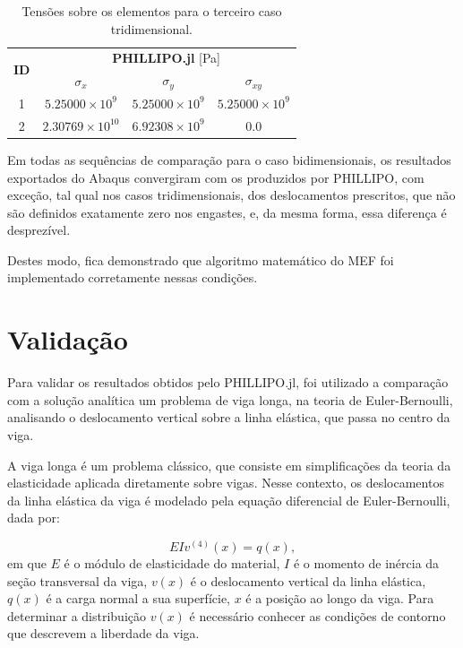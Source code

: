 \begin{table}
    \centering
    \caption{Tensões sobre os elementos para o terceiro caso tridimensional.}
    \begin{tabular}{c | c c c}
        \toprule
        \multirow{2}{*}{\textbf{ID}} & \multicolumn{3}{c}{\textbf{PHILLIPO.jl} [Pa]}  \\
                                           & \textbf{$\sigma_x$} & \textbf{$\sigma_y$} & \textbf{$\sigma_{xy}$} \\                            
        \midrule
        1 & $5.25000\times10^{9}$ & $5.25000\times10^{9}$ & $5.25000\times10^{9}$ \\
        2 & $2.30769\times10^{10}$ & $6.92308\times10^{9}$ & $0.0$ \\
        \bottomrule
    \end{tabular}
    \label{tab:verificacao_quadrado_3_tensoes}
\end{table}


Em todas as sequências de comparação para o caso bidimensionais, os resultados exportados do Abaqus convergiram com os produzidos por PHILLIPO, com exceção, tal qual nos casos tridimensionais, dos deslocamentos prescritos, que não são definidos exatamente zero nos engastes, e, da mesma forma, essa diferença é desprezível.

Destes modo, fica demonstrado que algoritmo matemático do MEF foi implementado corretamente nessas condições. 

\section{Validação}

Para validar os resultados obtidos pelo PHILLIPO.jl, foi utilizado a comparação com a solução analítica um problema de viga longa, na teoria de Euler-Bernoulli, analisando o deslocamento vertical sobre a linha elástica, que passa no centro da viga.

A viga longa é um problema clássico, que consiste em simplificações da teoria da elasticidade aplicada diretamente sobre vigas. Nesse contexto, os deslocamentos da linha elástica da viga é modelado pela equação diferencial de Euler-Bernoulli, dada por:

\begin{equation}
    EI v^{(4)}(x) = q(x),
\end{equation}
em que $E$ é o módulo de elasticidade do material, $I$ é o momento de inércia da seção transversal da viga, $v(x)$ é o deslocamento vertical da linha elástica, $q(x)$ é a carga normal a sua superfície, $x$ é a posição ao longo da viga. Para determinar a distribuição $v(x)$ é necessário conhecer as condições de contorno que descrevem a liberdade da viga. \cite{Hibbeler}

